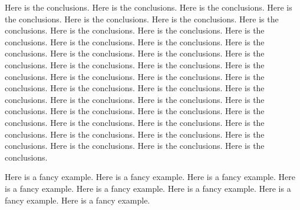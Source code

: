 
Here is the conclusions. Here is the conclusions. Here is the conclusions. Here is the conclusions. Here is the conclusions. Here is the conclusions. Here is the conclusions. Here is the conclusions. Here is the conclusions. Here is the conclusions. Here is the conclusions. Here is the conclusions. Here is the conclusions. Here is the conclusions. Here is the conclusions. Here is the conclusions. Here is the conclusions. Here is the conclusions. Here is the conclusions. Here is the conclusions. Here is the conclusions. Here is the conclusions. Here is the conclusions. Here is the conclusions. Here is the conclusions. Here is the conclusions. Here is the conclusions. Here is the conclusions. Here is the conclusions. Here is the conclusions. Here is the conclusions. Here is the conclusions. Here is the conclusions. Here is the conclusions. Here is the conclusions. Here is the conclusions. Here is the conclusions. Here is the conclusions. Here is the conclusions. Here is the conclusions. 

\begin{example}
Here is a fancy example. Here is a fancy example. Here is a fancy example. Here is a fancy example. Here is a fancy example. Here is a fancy example. Here is a fancy example. Here is a fancy example. 
\end{example}                  
